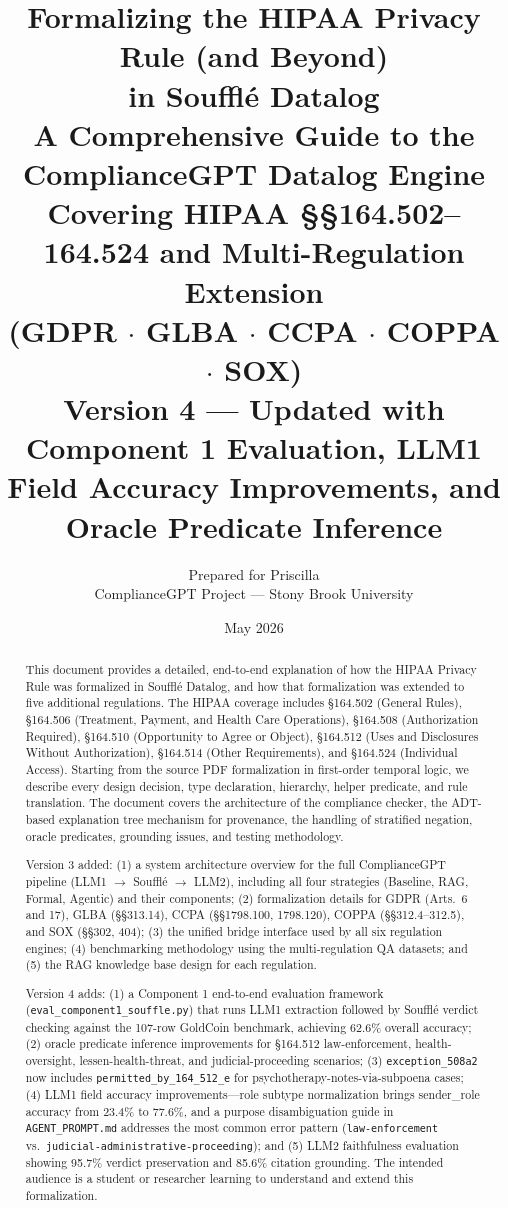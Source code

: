 \documentclass[11pt,letterpaper]{article}
\title{%
  \textbf{Formalizing the HIPAA Privacy Rule (and Beyond)}\\
  \textbf{in Souffl\'{e} Datalog}\\[0.5em]
  \large A Comprehensive Guide to the ComplianceGPT Datalog Engine\\
  \large Covering HIPAA \S\S 164.502--164.524 and Multi-Regulation Extension\\
  \large (GDPR $\cdot$ GLBA $\cdot$ CCPA $\cdot$ COPPA $\cdot$ SOX)\\[0.3em]
  \normalsize Version 4 --- Updated with Component 1 Evaluation, LLM1 Field Accuracy Improvements, and Oracle Predicate Inference
}
\author{%
  Prepared for Priscilla\\
  ComplianceGPT Project --- Stony Brook University
}
\date{May 2026}
\begin{document}
\maketitle

\begin{abstract}
This document provides a detailed, end-to-end explanation of how the HIPAA Privacy Rule was formalized in Souffl\'{e} Datalog, and how that formalization was extended to five additional regulations. The HIPAA coverage includes \S 164.502 (General Rules), \S 164.506 (Treatment, Payment, and Health Care Operations), \S 164.508 (Authorization Required), \S 164.510 (Opportunity to Agree or Object), \S 164.512 (Uses and Disclosures Without Authorization), \S 164.514 (Other Requirements), and \S 164.524 (Individual Access). Starting from the source PDF formalization in first-order temporal logic, we describe every design decision, type declaration, hierarchy, helper predicate, and rule translation. The document covers the architecture of the compliance checker, the ADT-based explanation tree mechanism for provenance, the handling of stratified negation, oracle predicates, grounding issues, and testing methodology.

Version 3 added: (1) a system architecture overview for the full ComplianceGPT pipeline (LLM1 $\to$ Souffl\'{e} $\to$ LLM2), including all four strategies (Baseline, RAG, Formal, Agentic) and their components; (2) formalization details for GDPR (Arts.~6 and 17), GLBA (\S\S 313.14), CCPA (\S\S 1798.100, 1798.120), COPPA (\S\S 312.4--312.5), and SOX (\S\S 302, 404); (3) the unified bridge interface used by all six regulation engines; (4) benchmarking methodology using the multi-regulation QA datasets; and (5) the RAG knowledge base design for each regulation.

Version 4 adds: (1) a Component 1 end-to-end evaluation framework (\texttt{eval\_component1\_souffle.py}) that runs LLM1 extraction followed by Souffl\'{e} verdict checking against the 107-row GoldCoin benchmark, achieving 62.6\% overall accuracy; (2) oracle predicate inference improvements for \S 164.512 law-enforcement, health-oversight, lessen-health-threat, and judicial-proceeding scenarios; (3) \texttt{exception\_508a2} now includes \texttt{permitted\_by\_164\_512\_e} for psychotherapy-notes-via-subpoena cases; (4) LLM1 field accuracy improvements---role subtype normalization brings sender\_role accuracy from 23.4\% to 77.6\%, and a purpose disambiguation guide in \texttt{AGENT\_PROMPT.md} addresses the most common error pattern (\texttt{law-enforcement} vs.\ \texttt{judicial-administrative-proceeding}); and (5) LLM2 faithfulness evaluation showing 95.7\% verdict preservation and 85.6\% citation grounding. The intended audience is a student or researcher learning to understand and extend this formalization.
\end{abstract}
\end{document}
